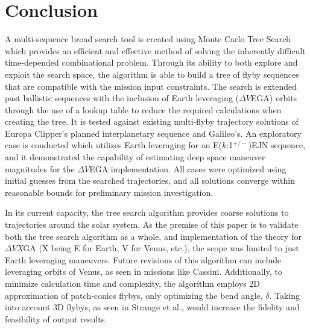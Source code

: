 \documentclass[letterpaper, paper,11pt]{AAS}	%
\begin{document}
\section*{Conclusion}

A multi-sequence broad search tool is created using Monte Carlo Tree Search which provides an efficient and effective method of solving the inherently difficult time-depended combinational problem. Through its ability to both explore and exploit the search space, the algorithm is able to build a tree of flyby sequences that are compatible with the mission input constraints. The search is extended past ballistic sequences with the inclusion of Earth leveraging ($\Delta V$EGA) orbits through the use of a lookup table to reduce the required calculations when creating the tree. It is tested against existing multi-flyby trajectory solutions of Europa Clipper's planned interplanetary sequence and Galileo's. An exploratory case is conducted which utilizes Earth leveraging for an E($k$:1$^{+/-}$)EJN sequence, and it demonstrated the capability of estimating deep space maneuver magnitudes for the $\Delta V$EGA implementation. All cases were optimized using initial guesses from the searched trajectories, and all solutions converge within reasonable bounds for preliminary mission investigation.

In its current capacity, the tree search algorithm provides coarse solutions to trajectories around the solar system. As the premise of this paper is to validate both the tree search algorithm as a whole, and implementation of the theory for $\Delta V$\textit{X}GA (X being E for Earth, V for Venus, etc.), the scope was limited to just Earth leveraging maneuvers. Future revisions of this algorithm can include leveraging orbits of Venus, as seen in missions like Cassini. Additionally, to minimize calculation time and complexity, the algorithm employs 2D approximation of patch-conics flybys, only optimizing the bend angle, $\delta$. Taking into account 3D flybys, as seen in Strange et al.\cite{Strange2008}, would increase the fidelity and feasibility of output results.

\end{document}
